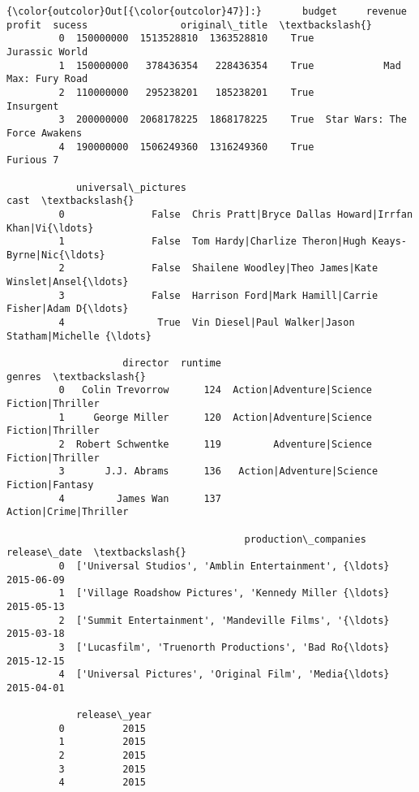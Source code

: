 \documentclass[11pt]{article}
\begin{document}
\begin{Verbatim}[commandchars=\\\{\}]
{\color{outcolor}Out[{\color{outcolor}47}]:}       budget     revenue      profit  sucess                original\_title  \textbackslash{}
         0  150000000  1513528810  1363528810    True                Jurassic World   
         1  150000000   378436354   228436354    True            Mad Max: Fury Road   
         2  110000000   295238201   185238201    True                     Insurgent   
         3  200000000  2068178225  1868178225    True  Star Wars: The Force Awakens   
         4  190000000  1506249360  1316249360    True                     Furious 7   
         
            universal\_pictures                                               cast  \textbackslash{}
         0               False  Chris Pratt|Bryce Dallas Howard|Irrfan Khan|Vi{\ldots}   
         1               False  Tom Hardy|Charlize Theron|Hugh Keays-Byrne|Nic{\ldots}   
         2               False  Shailene Woodley|Theo James|Kate Winslet|Ansel{\ldots}   
         3               False  Harrison Ford|Mark Hamill|Carrie Fisher|Adam D{\ldots}   
         4                True  Vin Diesel|Paul Walker|Jason Statham|Michelle {\ldots}   
         
                    director  runtime                                     genres  \textbackslash{}
         0   Colin Trevorrow      124  Action|Adventure|Science Fiction|Thriller   
         1     George Miller      120  Action|Adventure|Science Fiction|Thriller   
         2  Robert Schwentke      119         Adventure|Science Fiction|Thriller   
         3       J.J. Abrams      136   Action|Adventure|Science Fiction|Fantasy   
         4         James Wan      137                      Action|Crime|Thriller   
         
                                         production\_companies release\_date  \textbackslash{}
         0  ['Universal Studios', 'Amblin Entertainment', {\ldots}   2015-06-09   
         1  ['Village Roadshow Pictures', 'Kennedy Miller {\ldots}   2015-05-13   
         2  ['Summit Entertainment', 'Mandeville Films', '{\ldots}   2015-03-18   
         3  ['Lucasfilm', 'Truenorth Productions', 'Bad Ro{\ldots}   2015-12-15   
         4  ['Universal Pictures', 'Original Film', 'Media{\ldots}   2015-04-01   
         
            release\_year  
         0          2015  
         1          2015  
         2          2015  
         3          2015  
         4          2015  
\end{Verbatim}
            
\end{document}
